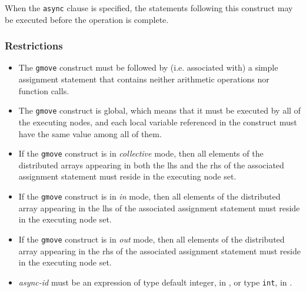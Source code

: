 When the {\tt async} clause is specified, the statements following this
construct may be executed before the operation is complete.

\subsubsection*{Restrictions}

\begin{itemize}
 \item The {\tt gmove} construct must be followed by (i.e. associated
       with) a simple assignment statement that contains neither
       arithmetic operations nor function calls.
 \item The {\tt gmove} construct is global, which means that it must be
       executed by all of the executing nodes, and each local variable
       referenced in the construct must have the same value among all of
       them.
 \item If the {\tt gmove} construct is in {\it collective} mode, then
       all elements of the distributed arrays appearing in both the
       lhs and the rhs of the associated assignment
       statement must reside in the executing node set.
 \item If the {\tt gmove} construct is in {\it in} mode, then
       all elements of the distributed array appearing in the lhs of the
       associated assignment statement must reside in the executing node
       set.
 \item If the {\tt gmove} construct is in {\it out} mode, then
       all elements of the distributed array appearing in the rhs of the
       associated assignment statement must reside in the executing node
       set.
 \item {\it async-id} must be an expression of type default integer, in
       {\XMPF}, or type {\tt int}, in {\XMPC}.
\end{itemize}

